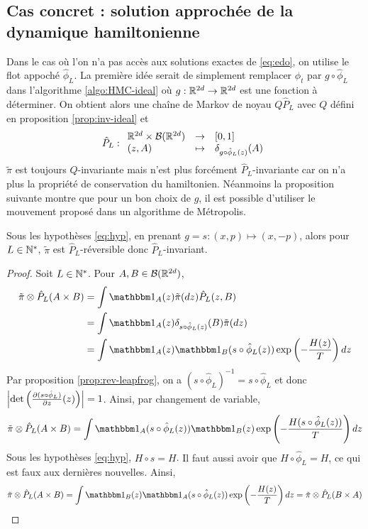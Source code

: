 \documentclass[10pt,a4paper]{article}
\newcommand{\red}{\color{red}}
\begin{document}
\subsection{Cas concret : solution approchée de la dynamique hamiltonienne}
Dans le cas où l'on n'a pas accès aux solutions exactes de \eqref{eq:edo}, on utilise le flot appoché $\hat{\phi}_L$. La première idée serait de simplement remplacer $\phi_t$ par $g \circ \hat{\phi}_L$ dans l'algorithme \ref{algo:HMC-ideal} où $g : \mathbb{R}^{2d} \to \mathbb{R}^{2d}$ est une fonction à déterminer. On obtient alors une chaîne de Markov de noyau $Q\hat{P}_L$ avec $Q$ défini en proposition \ref{prop:inv-ideal} et
$$
\hat{P}_L : { \begin{array}{lcl} 
  \mathbb{R}^{2d} \times \mathcal{B}(\mathbb{R}^{2d}) & \to & [0,1] \\
  (z, A) & \mapsto & \delta_{g \circ \hat{\phi}_L(z)}(A)
 \end{array} }
$$
$\widetilde{\pi}$ est toujours $Q$-invariante mais n'est plus forcément $\hat{P}_L$-invariante car on n'a plus la propriété de conservation du hamiltonien. Néanmoins la proposition suivante montre que pour un bon choix de $g$, il est possible d'utiliser le mouvement proposé dans un algorithme de Métropolis.

\begin{Prop}[réversibilité]
  Sous les hypothèses \eqref{eq:hyp}, en prenant $g = s : (x, p) \mapsto (x,-p)$, alors pour $L \in \mathbb{N}^*$, $\tilde \pi$ est $\hat{P}_L$-réversible donc $\hat{P}_L$-invariant. 
\end{Prop}
\begin{proof}
	Soit $L \in \mathbb{N}^*$. Pour $A,B \in \mathcal{B}(\mathbb{R}^{2d})$,
	\begin{align*}
	\tilde \pi \otimes \hat{P}_L (A \times B)
		&= \int \ind_A(z) \tilde \pi(dz) \hat P_L(z,B)\\
		&= \int \ind_A(z) \delta_{s \circ \hat \phi_L(z)}(B) \tilde \pi(dz)\\
		&= \int \ind_A(z) \ind_B(s \circ \hat \phi_L(z)) \exp \left(-\frac{H(z)}{T} \right) dz
	\end{align*}
	Par proposition \ref{prop:rev-leapfrog}, on a $(s\circ \hat{\phi}_L)^{-1} = s \circ \hat{\phi}_L$ et donc ${ \left| \det \left( \frac{\partial (s\circ \hat{\phi}_L)}{\partial z}(z) \right) \right|} = 1$. Ainsi, par changement de variable,
	$$
	\tilde \pi \otimes \hat{P}_L (A \times B)
	=
	\int \ind_A(s \circ \hat \phi_L(z)) \ind_B(z) \exp \left(-\frac{H(s \circ \hat \phi_L(z))}{T} \right) dz\\
	$$
	Sous les hypothèses \eqref{eq:hyp}, $H \circ s = H$. {\red Il faut aussi avoir que $H \circ \hat \phi_L = H$, ce qui est faux aux dernières nouvelles}.
	Ainsi,
	$$
	\tilde \pi \otimes \hat{P}_L (A \times B)
	=
	\int \ind_B(z) \ind_A(s \circ \hat \phi_L(z)) \exp \left(-\frac{H(z)}{T} \right) dz
	=
	\tilde \pi \otimes \hat{P}_L (B \times A)
	$$
\end{proof}
\end{document}

